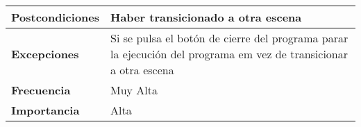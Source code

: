 \begin{longtable}{lll}
\textbf{Postcondiciones}                         & \multicolumn{2}{l}{Haber transicionado a otra escena}                                                                                \\ \hline
\textbf{Excepciones}                             & \multicolumn{2}{l}{Si se pulsa el botón de cierre del programa parar la ejecución del programa em vez de transicionar a otra escena} \\ \hline
\textbf{Frecuencia}                              & \multicolumn{2}{l}{Muy Alta}                                                                                                         \\ \hline
\textbf{Importancia}                             & \multicolumn{2}{l}{Alta}                                                                                                             \\ \hline
\end{longtable}

